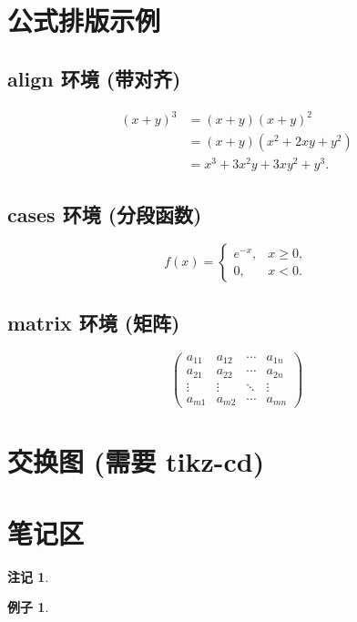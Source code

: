 \documentclass[12pt,a4paper]{article}
\theoremstyle{definition}
\newtheorem{example}{例子}[section]
\newtheorem{remark}{注记}[section]
\begin{document}
\section{公式排版示例}

\subsection{align 环境 (带对齐)}
\begin{align}
  (x + y)^3 &= (x + y)(x + y)^2 \\
            &= (x + y)(x^2 + 2xy + y^2) \\
            &= x^3 + 3x^2 y + 3x y^2 + y^3.
\end{align}

\subsection{cases 环境 (分段函数)}
\[
f(x) =
\begin{cases}
  e^{-x}, & x \ge 0, \\[4pt]
  0,      & x < 0.
\end{cases}
\]

\subsection{matrix 环境 (矩阵)}
\[
\begin{pmatrix}
  a_{11} & a_{12} & \cdots & a_{1n} \\
  a_{21} & a_{22} & \cdots & a_{2n} \\
  \vdots & \vdots & \ddots & \vdots \\
  a_{m1} & a_{m2} & \cdots & a_{mn}
\end{pmatrix}
\]

\section{交换图 (需要 tikz-cd)}

\newpage
\section{笔记区}

\begin{remark}
  
\end{remark}

\begin{example}
  
\end{example}
\end{document}
